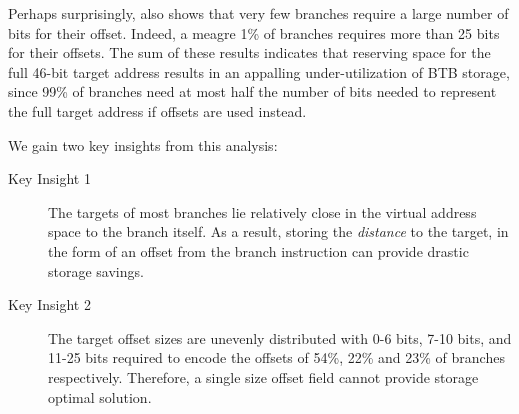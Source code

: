 Perhaps surprisingly,  also shows that very few branches require a large number of bits for their offset. Indeed, a meagre 1\% of branches requires more than 25 bits for their offsets. The sum of these results indicates that reserving space for the full 46-bit target address results in an appalling under-utilization of BTB storage, since 99\% of branches need at most half the number of bits needed to represent the full target address if offsets are used instead.

We gain two key insights from this analysis:

\begin{description}
\item[Key Insight 1] The targets of most branches lie relatively close in the virtual address space to the branch itself. As a result, storing the {\em distance} to the target, in the form of an offset from the branch instruction can provide drastic storage savings. 

\item[Key Insight 2] The target offset sizes are unevenly distributed with 0-6 bits, 7-10 bits, and 11-25 bits required to encode the offsets of 54\%, 22\% and 23\% of branches respectively. Therefore, a single size offset field cannot provide storage optimal solution.
\end{description}
